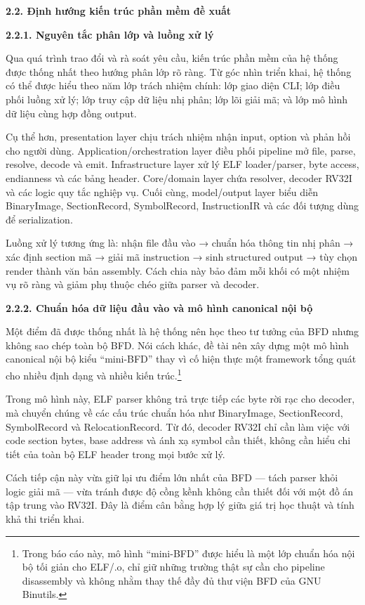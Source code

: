 \documentclass[
]{article}
\begin{document}
\textbf{2.2. Định hướng kiến trúc phần mềm đề xuất}

\textbf{2.2.1. Nguyên tắc phân lớp và luồng xử lý}

Qua quá trình trao đổi và rà soát yêu cầu, kiến trúc phần mềm của hệ
thống được thống nhất theo hướng phân lớp rõ ràng. Từ góc nhìn triển
khai, hệ thống có thể được hiểu theo năm lớp trách nhiệm chính: lớp giao
diện CLI; lớp điều phối luồng xử lý; lớp truy cập dữ liệu nhị phân; lớp
lõi giải mã; và lớp mô hình dữ liệu cùng hợp đồng output.

Cụ thể hơn, presentation layer chịu trách nhiệm nhận input, option và
phản hồi cho người dùng. Application/orchestration layer điều phối
pipeline mở file, parse, resolve, decode và emit. Infrastructure layer
xử lý ELF loader/parser, byte access, endianness và các bảng header.
Core/domain layer chứa resolver, decoder RV32I và các logic quy tắc
nghiệp vụ. Cuối cùng, model/output layer biểu diễn BinaryImage,
SectionRecord, SymbolRecord, InstructionIR và các đối tượng dùng để
serialization.

Luồng xử lý tương ứng là: nhận file đầu vào → chuẩn hóa thông tin nhị
phân → xác định section mã → giải mã instruction → sinh structured
output → tùy chọn render thành văn bản assembly. Cách chia này bảo đảm
mỗi khối có một nhiệm vụ rõ ràng và giảm phụ thuộc chéo giữa parser và
decoder.

\textbf{2.2.2. Chuẩn hóa dữ liệu đầu vào và mô hình canonical nội bộ}

Một điểm đã được thống nhất là hệ thống nên học theo tư tưởng của BFD
nhưng không sao chép toàn bộ BFD. Nói cách khác, đề tài nên xây dựng một
mô hình canonical nội bộ kiểu ``mini-BFD'' thay vì cố hiện thực một
framework tổng quát cho nhiều định dạng và nhiều kiến trúc.\footnote{Trong
  báo cáo này, mô hình ``mini-BFD'' được hiểu là một lớp chuẩn hóa nội
  bộ tối giản cho ELF/.o, chỉ giữ những trường thật sự cần cho pipeline
  disassembly và không nhằm thay thế đầy đủ thư viện BFD của GNU
  Binutils.}

Trong mô hình này, ELF parser không trả trực tiếp các byte rời rạc cho
decoder, mà chuyển chúng về các cấu trúc chuẩn hóa như BinaryImage,
SectionRecord, SymbolRecord và RelocationRecord. Từ đó, decoder RV32I
chỉ cần làm việc với code section bytes, base address và ánh xạ symbol
cần thiết, không cần hiểu chi tiết của toàn bộ ELF header trong mọi bước
xử lý.

Cách tiếp cận này vừa giữ lại ưu điểm lớn nhất của BFD --- tách parser
khỏi logic giải mã --- vừa tránh được độ cồng kềnh không cần thiết đối
với một đồ án tập trung vào RV32I. Đây là điểm cân bằng hợp lý giữa giá
trị học thuật và tính khả thi triển khai.
\end{document}
